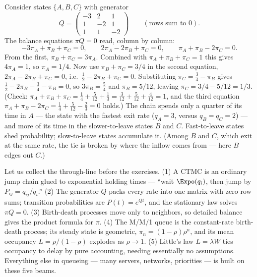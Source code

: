 \begin{example}
\label{ch27:ex-threestate}
Consider states $\{A, B, C\}$ with generator
\[
  Q = \begin{pmatrix} -3 & 2 & 1 \\ 1 & -2 & 1 \\ 1 & 1 & -2 \end{pmatrix}
  \qquad(\text{rows sum to } 0).
\]
The balance equations $\pi Q = 0$ read, column by column:
\[
  -3\pi_A + \pi_B + \pi_C = 0, \qquad
  2\pi_A - 2\pi_B + \pi_C = 0, \qquad
  \pi_A + \pi_B - 2\pi_C = 0.
\]
From the first, $\pi_B + \pi_C = 3\pi_A$. Combined with $\pi_A + \pi_B + \pi_C = 1$ this gives
$4\pi_A = 1$, so $\pi_A = 1/4$. Now use $\pi_B + \pi_C = 3/4$ in the second equation,
$2\pi_A - 2\pi_B + \pi_C = 0$, i.e.\ $\tfrac12 - 2\pi_B + \pi_C = 0$. Substituting
$\pi_C = \tfrac34 - \pi_B$ gives $\tfrac12 - 2\pi_B + \tfrac34 - \pi_B = 0$, so $3\pi_B = \tfrac54$ and
$\pi_B = 5/12$, leaving $\pi_C = 3/4 - 5/12 = 1/3$. (Check: $\pi_A + \pi_B + \pi_C = \tfrac14 +
\tfrac{5}{12} + \tfrac13 = \tfrac{3}{12}+\tfrac{5}{12}+\tfrac{4}{12} = 1$, and the third equation
$\pi_A + \pi_B - 2\pi_C = \tfrac14 + \tfrac{5}{12} - \tfrac23 = 0$ holds.) The chain spends only a
quarter of its time in $A$ --- the state with the fastest exit rate ($q_A = 3$, versus $q_B = q_C =
2$) --- and more of its time in the slower-to-leave states $B$ and $C$. Fast-to-leave states shed
probability; slow-to-leave states accumulate it. (Among $B$ and $C$, which exit at the same rate, the
tie is broken by where the inflow comes from --- here $B$ edges out $C$.)
\end{example}

\begin{recoverybox}
Let us collect the through-line before the exercises. (1) A CTMC is an ordinary jump chain glued to
exponential holding times --- ``wait $\Expo(q_i)$, then jump by $P_{ij} = q_{ij}/q_i$.'' (2) The
generator $Q$ packs every rate into one matrix with zero row sums; transition probabilities are
$P(t) = e^{Qt}$, and the stationary law solves $\pi Q = 0$. (3) Birth-death processes move only to
neighbors, so detailed balance gives the product formula for $\pi$. (4) The M/M/1 queue is the
constant-rate birth-death process; its steady state is geometric, $\pi_n = (1-\rho)\rho^n$, and its
mean occupancy $L = \rho/(1-\rho)$ explodes as $\rho \to 1$. (5) Little's law $L = \lambda W$ ties
occupancy to delay by pure accounting, needing essentially no assumptions. Everything else in
queueing --- many servers, networks, priorities --- is built on these five beams.
\end{recoverybox}

